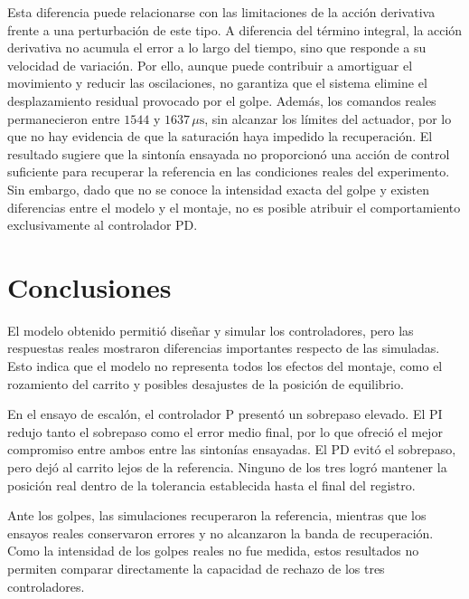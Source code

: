 \documentclass[a4paper, twoside, 10pt, spanish]{article}
\numberwithin{table}{section}
\begin{document}
    Esta diferencia puede relacionarse con las limitaciones de la acción derivativa frente a una perturbación de este tipo. A diferencia del término integral, la acción derivativa no acumula el error a lo largo del tiempo, sino que responde a su velocidad de variación. Por ello, aunque puede contribuir a amortiguar el movimiento y reducir las oscilaciones, no garantiza que el sistema elimine el desplazamiento residual provocado por el golpe. Además, los comandos reales permanecieron entre $1544$ y $1637\,\mu\text{s}$, sin alcanzar los límites del actuador, por lo que no hay evidencia de que la saturación haya impedido la recuperación. El resultado sugiere que la sintonía ensayada no proporcionó una acción de control suficiente para recuperar la referencia en las condiciones reales del experimento. Sin embargo, dado que no se conoce la intensidad exacta del golpe y existen diferencias entre el modelo y el montaje, no es posible atribuir el comportamiento exclusivamente al controlador PD.

    \section{Conclusiones}
    El modelo obtenido permitió diseñar y simular los controladores, pero las respuestas reales mostraron diferencias importantes respecto de las simuladas. Esto indica que el modelo no representa todos los efectos del montaje, como el rozamiento del carrito y posibles desajustes de la posición de equilibrio.

    En el ensayo de escalón, el controlador P presentó un sobrepaso elevado. El PI redujo tanto el sobrepaso como el error medio final, por lo que ofreció el mejor compromiso entre ambos entre las sintonías ensayadas. El PD evitó el sobrepaso, pero dejó al carrito lejos de la referencia. Ninguno de los tres logró mantener la posición real dentro de la tolerancia establecida hasta el final del registro.

    Ante los golpes, las simulaciones recuperaron la referencia, mientras que los ensayos reales conservaron errores y no alcanzaron la banda de recuperación. Como la intensidad de los golpes reales no fue medida, estos resultados no permiten comparar directamente la capacidad de rechazo de los tres controladores.

    
\end{document}
